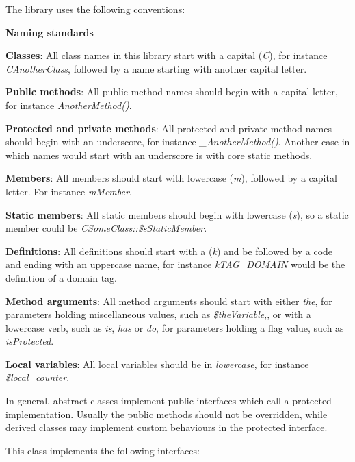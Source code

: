 The library uses the following conventions\-:

{\bfseries Naming standards}


\begin{DoxyItemize}
\item {\bfseries Classes}\-: All class names in this library start with a capital ({\itshape C}), for instance {\itshape C\-Another\-Class}, followed by a name starting with another capital letter. 
\item {\bfseries Public methods}\-: All public method names should begin with a capital letter, for instance {\itshape Another\-Method()}. 
\item {\bfseries Protected and private methods}\-: All protected and private method names should begin with an underscore, for instance {\itshape \-\_\-\-Another\-Method()}. Another case in which names would start with an underscore is with core static methods. 
\item {\bfseries Members}\-: All members should start with lowercase ({\itshape m}), followed by a capital letter. For instance {\itshape m\-Member}. 
\item {\bfseries Static members}\-: All static members should begin with lowercase ({\itshape s}), so a static member could be {\itshape C\-Some\-Class\-::\$s\-Static\-Member}. 
\item {\bfseries Definitions}\-: All definitions should start with a ({\itshape k}) and be followed by a code and ending with an uppercase name, for instance {\itshape k\-T\-A\-G\-\_\-\-D\-O\-M\-A\-I\-N} would be the definition of a domain tag. 
\item {\bfseries Method arguments}\-: All method arguments should start with either {\itshape the}, for parameters holding miscellaneous values, such as {\itshape \$the\-Variable},, or with a lowercase verb, such as {\itshape is}, {\itshape has} or {\itshape do}, for parameters holding a flag value, such as {\itshape is\-Protected}. 
\item {\bfseries Local variables}\-: All local variables should be in {\itshape lowercase}, for instance {\itshape \$local\-\_\-counter}. 
\end{DoxyItemize}

In general, abstract classes implement public interfaces which call a protected implementation. Usually the public methods should not be overridden, while derived classes may implement custom behaviours in the protected interface.

This class implements the following interfaces\-:


